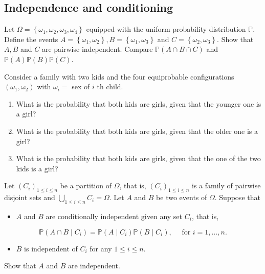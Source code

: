 \begin{center}
    \section*{Independence and conditioning}
\end{center}

\begin{Exercise}
     Let $\Omega=\left\{\omega_{1}, \omega_{2}, \omega_{3}, \omega_{4}\right\}$ equipped with the uniform probability distribution $\mathbb{P}$. Define the events $A=\left\{\omega_{1}, \omega_{2}\right\}, B=\left\{\omega_{1}, \omega_{3}\right\}$ and $C=\left\{\omega_{2}, \omega_{3}\right\}$. Show that $A, B$ and $C$ are pairwise independent. Compare $\mathbb{P}(A \cap B \cap C)$ and $\mathbb{P}(A) \mathbb{P}(B) \mathbb{P}(C)$.
\end{Exercise}

\begin{Exercise}
Consider a family with two kids and the four equiprobable configurations $\left(\omega_{1}, \omega_{2}\right)$ with $\omega_{i}=$ sex of $i$ th child.

\begin{enumerate}
  \item What is the probability that both kids are girls, given that the younger one is a girl?

  \item What is the probability that both kids are girls, given that the older one is a girl?

  \item What is the probability that both kids are girls, given that the one of the two kids is a girl?

\end{enumerate}
\end{Exercise}

\begin{Exercise}
    

Let $\left(C_{i}\right)_{1 \leq i \leq n}$ be a partition of $\Omega$, that is, $\left(C_{i}\right)_{1 \leq i \leq n}$ is a family of pairwise disjoint sets and $\bigcup_{1 \leq i \leq n} C_{i}=\Omega$. Let $A$ and $B$ be two events of $\Omega$. Suppose that

\begin{itemize}
  \item $A$ and $B$ are conditionally independent given any set $C_{i}$, that is,
\end{itemize}

$$
\mathbb{P}\left(A \cap B \mid C_{i}\right)=\mathbb{P}\left(A \mid C_{i}\right) \mathbb{P}\left(B \mid C_{i}\right), \quad \text { for } i=1, \ldots, n .
$$

\begin{itemize}
  \item $B$ is independent of $C_{i}$ for any $1 \leq i \leq n$.
\end{itemize}

Show that $A$ and $B$ are independent.
\end{Exercise}

